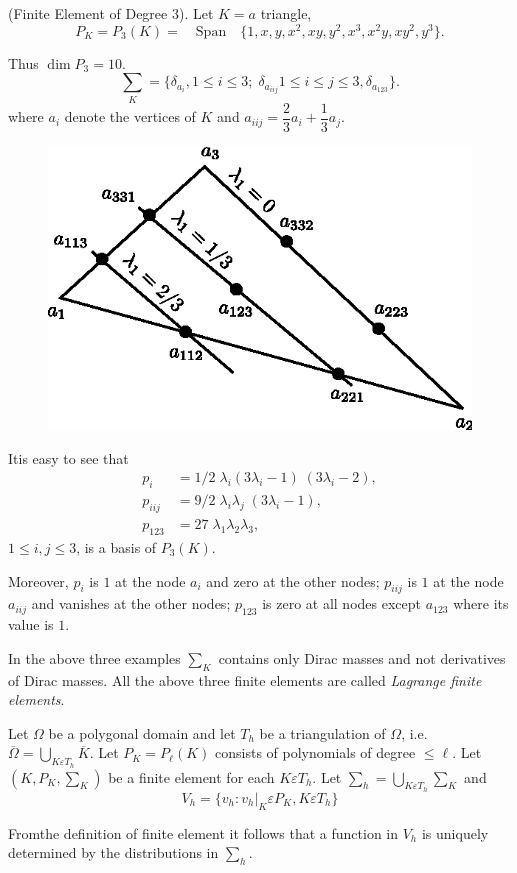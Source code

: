 \begin{exam}\label{chap3:exm3}
(Finite Element of Degree 3). Let $K=a$ triangle, 
$$
P_K=P_3(K)=\quad\text{Span}\quad \{
1,x,y,x^2,xy,y^2,x^3,x^2y,xy^2,y^3\}.
$$

Thus $\dim P_3=10$.
$$
\sum_K=\{ \delta_{a_i}, 1\leq i\leq 3; \; \delta_{a_{iij}} 1\leq i\leq
j\leq 3, \delta_{a_{123}} \}.
$$
where $a_i$ denote the vertices of $K$ and $a_{iij}=\dfrac{2}{3}a_i+
\dfrac{1}{3} a_j$.
\begin{figure}[H]
\centering
\includegraphics{figure/fig3.5.eps}
\caption{}\label{fig3.5}
\end{figure}


It\pageoriginale is easy to see that 
\begin{align*}
p_i &= 1/2\;\lambda_i(3\lambda_i-1)\; (3\lambda_i-2),\\
p_{iij} &= 9/2\;\lambda_i\lambda_j\; (3\lambda_i-1),\\
p_{123} &= 27\; \lambda_1\lambda_2\lambda_3,
\end{align*}
$1\leq i, j\leq 3$, is a basis of $P_3(K)$.

\noindent Moreover, $p_i$ is $1$ at the node $a_i$ and zero at the
other nodes; $p_{iij}$ is $1$ at the node $a_{iij}$ and vanishes at
the other nodes; $p_{123}$ is zero at all nodes except $a_{123}$ where
its value is $1$.
\end{exam}

\begin{REM}\label{chap3:REM3}
In the above three examples $\sum_K$ contains only Dirac masses and
not derivatives of Dirac masses. All the above three finite elements
are called \emph{Lagrange finite elements}.

Let $\Omega$ be a polygonal domain and let $T_h$ be a triangulation of
$\Omega$, i.e. $\overline{\Omega}=\bigcup\limits_{K\varepsilon T_h}
\overline{K}$. Let $P_K=P_\ell(K)$ consists of polynomials of degree
$\leq\ell$. Let $(K, P_K, \sum_K)$ be a finite element for each $K
\varepsilon T_h$. Let $\sum_h=\bigcup\limits_{K\varepsilon T_h}
\sum_K$ and 
$$
V_h=\{ v_h:v_h|_K\varepsilon P_K, K\varepsilon T_h\}
$$

From\pageoriginale the definition of finite element it follows that a
function in $V_h$ is uniquely determined by the distributions in $\sum_h$.
\end{REM}

